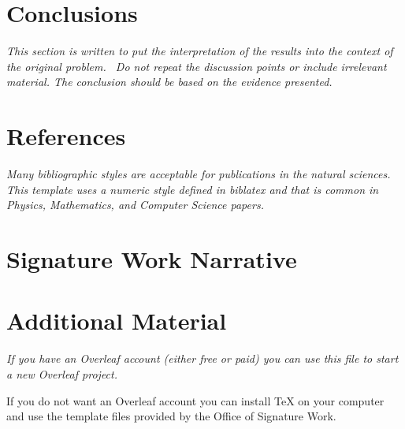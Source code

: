 \documentclass[12pt, a4paper, oneside]{report}
\newcommand{\instructions}[1]{{\color{orange}\itshape #1}}
\begin{document}

\chapter{Conclusions}
\label{conclusions}

\instructions{This section is written to put the interpretation of the results into the context of the original problem.~ Do not repeat the discussion points or include irrelevant material. The conclusion should be based on the evidence presented.}


\chapter*{References}
\label{references}


\instructions{Many bibliographic styles are acceptable for publications in the natural sciences. This template uses a numeric style defined in biblatex and that is common in Physics, Mathematics, and Computer Science papers.}

\printbibliography[heading=none]



\chapter*{Signature Work Narrative}
\label{narrative}





\appendix

\chapter{Additional Material}
\label{appendix-a}


\instructions{If you have an Overleaf account (either free or paid) you can use this file to start a new Overleaf project.

If you do not want an Overleaf account you can install TeX on your computer and use the template files provided by the Office of Signature Work.}
\end{document}
